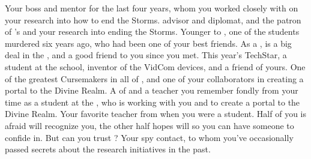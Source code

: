 \documentclass[char]{GL2020}
\begin{document}
\begin{contacts}
    \contact{\cHeadScientist{}} Your boss and mentor for the last four years, whom you worked closely with on your research into how to end the Storms. 
    \contact{\cDiplomat{}} \pTech{} advisor and diplomat, and the patron of \cHeadScientist{}'s and your research into ending the Storms.
    \contact{\cHeir{}} Younger \cHeir{\sibling} to \cHeirSibling{}, one of the students murdered six years ago, who had been one of your best friends. As a \cHeir{\formal}, \cHeir{} is a big deal in the \pTech{}, and a good friend to you since you met.
    \contact{\cTechStar{}} This year's TechStar, a student at the school, inventor of the VidCom devices, and a friend of yours. 
    \contact{\cCurse{}} One of the greatest Cursemakers in all of \pEarth{}, and one of your collaborators in creating a portal to the Divine Realm.
    \contact{\cFlowPriest{}} A \cFlowPriest{\cleric} of \cFlow{} and a teacher you remember fondly from your time as a student at the \pSchool{}, who is working with you and \cCurse{} to create a portal to the Divine Realm.
    \contact{\cMusic{}} Your favorite teacher from when you were a student. Half of you is afraid \cMusic{\they} will recognize you, the other half hopes \cMusic{\they} will so you can have someone to confide in. But can you trust \cMusic{\them}?
    \contact{\cBunker{}} Your \pShippie{} spy contact, to whom you've occasionally passed secrets about the \pTech{} research initiatives in the past. 
\end{contacts}
\end{document}
